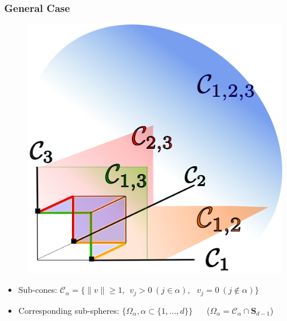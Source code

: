 \documentclass[9pt]{beamer}
\begin{document}
\begin{frame}
\frametitle{General Case}
  \begin{figure}
    \centering
    \includegraphics[width=0.4\linewidth]{sourcefigs/cone}
  \end{figure}
  \begin{itemize}
\item Sub-cones:  $\mathcal{C}_\alpha = \big\{\|v\|\ge 1,~~ v_j> 0 ~ (j\in\alpha),~~~  v_j = 0~(j\notin\alpha)\big\}$

\item   Corresponding sub-spheres: $\big\{\Omega_\alpha , \alpha\subset\{1,\dotsc,d\}\big\}$ ~~ ($\Omega_\alpha = \mathcal{C}_\alpha \cap \mathbf{S}_{d-1}$)
\end{itemize}
\end{frame}


  
\end{document}
